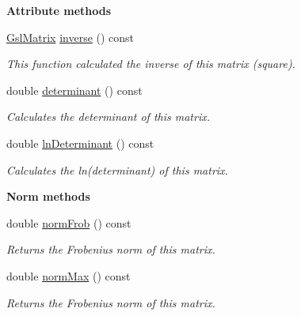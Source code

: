 \begin{Indent}{\bf Attribute methods}
\begin{DoxyCompactItemize}
\hyperlink{class_q_u_e_s_o_1_1_gsl_matrix}{Gsl\-Matrix} \hyperlink{class_q_u_e_s_o_1_1_gsl_matrix_a275b4bec91c45ffce825d59c4db444de}{inverse} () const 
\begin{DoxyCompactList}\small\item\em This function calculated the inverse of {\ttfamily this} matrix (square). \end{DoxyCompactList}\item 
double \hyperlink{class_q_u_e_s_o_1_1_gsl_matrix_ae2bc9b0563ea232d7ccd06be45047517}{determinant} () const 
\begin{DoxyCompactList}\small\item\em Calculates the determinant of {\ttfamily this} matrix. \end{DoxyCompactList}\item 
double \hyperlink{class_q_u_e_s_o_1_1_gsl_matrix_afe7d8716005fb950cd4c2bf16e0cee93}{ln\-Determinant} () const 
\begin{DoxyCompactList}\small\item\em Calculates the ln(determinant) of {\ttfamily this} matrix. \end{DoxyCompactList}\end{DoxyCompactItemize}
\end{Indent}
\begin{Indent}{\bf Norm methods}\par
\begin{DoxyCompactItemize}
\item 
double \hyperlink{class_q_u_e_s_o_1_1_gsl_matrix_a3bf3826b5a8d5a9b8b8f43e34de4465a}{norm\-Frob} () const 
\begin{DoxyCompactList}\small\item\em Returns the Frobenius norm of {\ttfamily this} matrix. \end{DoxyCompactList}\item 
double \hyperlink{class_q_u_e_s_o_1_1_gsl_matrix_a048b3dd7324555448cebd7225fc179c6}{norm\-Max} () const 
\begin{DoxyCompactList}\small\item\em Returns the Frobenius norm of {\ttfamily this} matrix. \end{DoxyCompactList}\end{DoxyCompactItemize}
\end{Indent}
